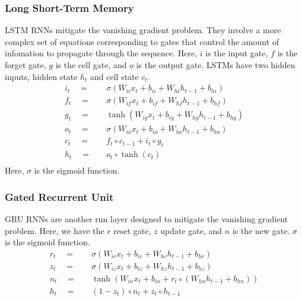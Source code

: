 \documentclass[twoside,twocolumn]{article}
\begin{document}
\subsubsection{Long Short-Term Memory}
LSTM RNNs mitigate the vanishing gradient problem. They involve a more complex
set of equations corresponding to gates that control the amount of infomation
to propagate through the sequence. Here, $i$ is the input gate, $f$ is the
forget gate, $g$ is the cell gate, and $o$ is the output gate. LSTMs have
two hidden inputs, hidden state $h_t$ and cell state $c_t$.
\begin{equation}
  \begin{split}
    i_t \quad =& \quad \sigma \left( W_{ii} x_t + b_{ii} + W_{hi} h_{t-1} + b_{hi} \right) \\
    f_t \quad =& \quad \sigma \left( W_{if} x_t + b_{if} + W_{hf} h_{t-1} + b_{hf} \right) \\
    g_t \quad =& \quad \tanh \left( W_{ig} x_t + b_{ig} + W_{hg} h_{t-1} + b_{hg} \right) \\
    o_t \quad =& \quad \sigma \left( W_{io} x_t + b_{io} + W_{ho} h_{t-1} + b_{ho} \right) \\
    c_t \quad =& \quad f_t \circ c_{t-1} + i_t \circ g_t \\
    h_t \quad =& \quad o_t \circ \tanh \left( c_t \right) \\
  \end{split}
\end{equation}
Here, $\sigma$ is the sigmoid function.
\subsubsection{Gated Recurrent Unit}
GRU RNNs are another rnn layer designed to mitigate the vanishing gradient
problem. Here, we have the $r$ reset gate, $z$ update gate, and $n$ is the
new gate. $\sigma$ is the sigmoid function.
\begin{equation}
  \begin{split}
    r_t \quad =& \quad \sigma \left( W_{ir} x_t + b_{ir} + W_{hr} h_{t-1} + b_{hr} \right) \\
    z_t \quad =& \quad \sigma \left( W_{iz} x_t + b_{iz} + W_{hz} h_{t-1} + b_{hz} \right) \\
    n_t \quad =& \quad \tanh \left( W_{in} x_t + b_{in} + r_t \circ \left( W_{hn} h_{t-1} + b_{hn} \right) \right) \\
    h_t \quad =& \quad \left(1-z_t\right) \circ n_t + z_t \circ h_{t-1} \\
  \end{split}
\end{equation}
\end{document}

